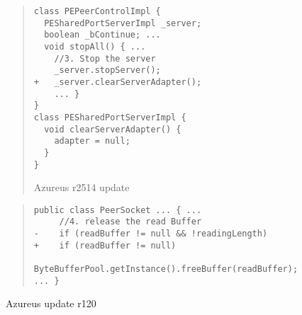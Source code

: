 \begin{figure}[t]
\vspace*{-1em}
\begin{quote}
\begin{lstlisting}
class PEPeerControlImpl {
  PESharedPortServerImpl _server; 
  boolean _bContinue; ...
  void stopAll() { ...
    //3. Stop the server
    _server.stopServer();
+   _server.clearServerAdapter();
    ... }
}
class PESharedPortServerImpl {
  void clearServerAdapter() {
    adapter = null;
  }
}
\end{lstlisting}
\vspace*{-.5em}
\caption{Azureus r2514 update\label{fig:azureus-r2514}}
\end{quote}
\vspace*{-1em}

\begin{quote}
\begin{lstlisting}
public class PeerSocket ... { ...
     //4. release the read Buffer
-    if (readBuffer != null && !readingLength)
+    if (readBuffer != null)
       ByteBufferPool.getInstance().freeBuffer(readBuffer);
... }
\end{lstlisting}
\vspace*{-.5em}
\caption{Azureus update r120\label{fig:azureus-r120}}
\end{quote}
\end{figure}

